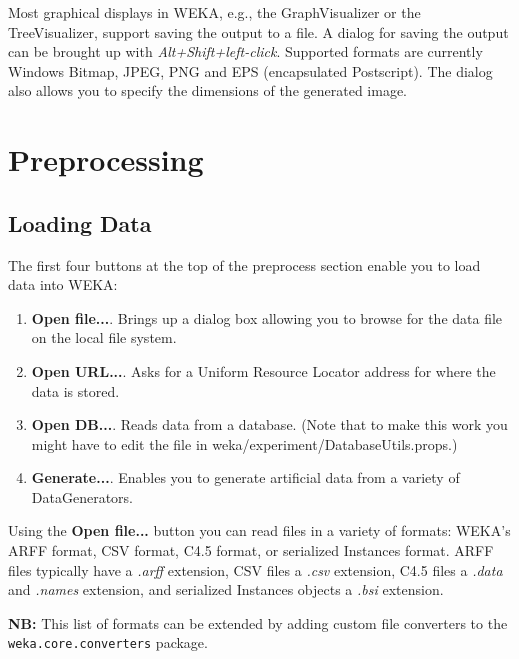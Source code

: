 Most graphical displays in WEKA, e.g., the GraphVisualizer or the
TreeVisualizer, support saving the output to a file. A dialog for saving 
the output can be brought up with \textit{Alt+Shift+left-click}. 
Supported formats are currently Windows Bitmap, JPEG, PNG and EPS 
(encapsulated Postscript). The dialog also allows you to specify the
dimensions of the generated image.

\newpage

\section{Preprocessing}

\begin{center}
\end{center}

\subsection{Loading Data}

The first four buttons at the top of the preprocess section enable
you to load data into WEKA:

\begin{enumerate}
\item \textbf{Open file...}.
Brings up a dialog box allowing you to browse for the data file on the local
file system.
\item \textbf{Open URL...}.
Asks for a Uniform Resource Locator address for where the data is stored.
\item \textbf{Open DB...}.  Reads data from a database. (Note that to
make this work you might have to edit the file in
weka/experiment/DatabaseUtils.props.)
\item \textbf{Generate...}.  Enables you to generate artificial data
from a variety of DataGenerators.
\end{enumerate}
\noindent
Using the \textbf{Open file...} button you can read files in a variety
of formats: WEKA's ARFF format, CSV format, C4.5 format, or serialized
Instances format. ARFF files typically have a {\em .arff\/}
extension, CSV files a {\em .csv\/} extension, C4.5 files a {\em
.data\/} and {\em .names\/} extension, and serialized Instances
objects a {\em .bsi\/} extension. 

\textbf{NB:} This list of formats can be extended by adding custom file 
converters to the \texttt{weka.core.converters} package.

